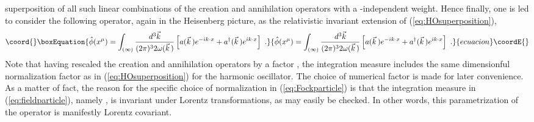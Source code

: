\documentclass[a4paper,11pt]{article}
\begin{document}
superposition of all such linear combinations of the creation and
annihilation operators with a \coordHE{}-independent weight. Hence finally, 
one is led to consider the following operator, again in the Heisenberg picture,
as the relativistic invariant extension of (\ref{eq:HOsuperposition}),
\begin{equation}\coord{}\boxEquation{
\hat{\phi}(x^\mu)=\int_{(\infty)}\frac{d^3\vec{k}}{(2\pi)^32\omega(\vec{k}\,)}
\left[a(\vec{k}\,)e^{-ik\cdot x}+a^\dagger(\vec{k}\,)e^{ik\cdot x}\right]\ .
\label{eq:fieldparticle}
}{
\hat{\phi}(x^\mu)=\int_{(\infty)}\frac{d^3\vec{k}}{(2\pi)^32\omega(\vec{k}\,)}
\left[a(\vec{k}\,)e^{-ik\cdot x}+a^\dagger(\vec{k}\,)e^{ik\cdot x}\right]\ .
}{ecuacion}\coordE{}\end{equation}
Note that having rescaled the creation and annihilation operators by
a factor \coordHE{}, the \coordHE{} integration
measure includes the same dimensionful normalization factor as in 
(\ref{eq:HOsuperposition}) for the harmonic oscillator. The choice of 
numerical factor \coordHE{} is made
for later convenience. As a matter of fact, the reason for the specific
choice of normalization in (\ref{eq:Fockparticle}) is that the
integration measure in (\ref{eq:fieldparticle}), namely
\coordHE{}, is invariant under Lorentz transformations,
as may easily be checked. In other words, this parametrization of the
operator \coordHE{} is manifestly Lorentz covariant.
\end{document}
